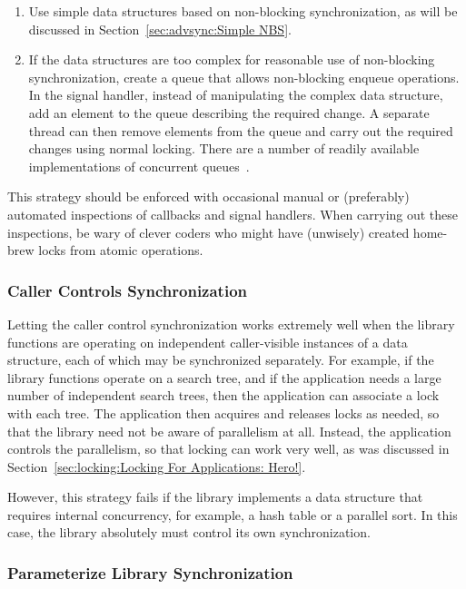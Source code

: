 \begin{enumerate}
\item	Use simple data structures based on non-blocking synchronization,
	as will be discussed in
	Section~\ref{sec:advsync:Simple NBS}.
\item	If the data structures are too complex for reasonable use of
	non-blocking synchronization, create a queue that allows
	non-blocking enqueue operations.
	In the signal handler, instead of manipulating the complex
	data structure, add an element to the queue describing the
	required change.
	A separate thread can then remove elements from the queue and
	carry out the required changes using normal locking.
	There are a number of readily available implementations of
	concurrent
	queues~\cite{ChristophMKirsch2012FIFOisntTR,MathieuDesnoyers2009URCU,MichaelScott96}.
\end{enumerate}

This strategy should be enforced with occasional manual or (preferably)
automated inspections of callbacks and signal handlers.
When carrying out these inspections, be wary of clever coders who
might have (unwisely) created home-brew locks from atomic operations.

\subsubsection{Caller Controls Synchronization}
\label{sec:locking:Caller Controls Synchronization}

Letting the caller control synchronization
works extremely well when the library functions are operating
on independent caller-visible instances of a data structure, each
of which may be synchronized separately.
For example, if the library functions operate on a search tree,
and if the application needs a large number of independent search
trees, then the application can associate a lock with each tree.
The application then acquires and releases locks as needed, so
that the library need not be aware of parallelism at all.
Instead, the application controls the parallelism, so that locking
can work very well, as was discussed in
Section~\ref{sec:locking:Locking For Applications: Hero!}.

However, this strategy fails if the
library implements a data structure that requires internal
concurrency, for example, a hash table or a parallel sort.
In this case, the library absolutely must control its own
synchronization.

\subsubsection{Parameterize Library Synchronization}
\label{sec:locking:Parameterize Library Synchronization}

